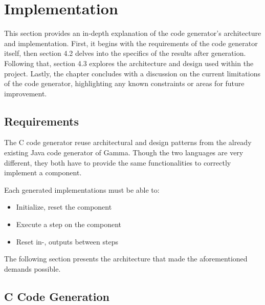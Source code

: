 \chapter{Implementation}

This section provides an in-depth explanation of the code generator's architecture and implementation. First, it begins with the requirements of the code generator itself, then section 4.2 delves into the specifics of the results after generation. Following that, section 4.3 explores the architecture and design used within the project. Lastly, the chapter concludes with a discussion on the current limitations of the code generator, highlighting any known constraints or areas for future improvement.

\section{Requirements}

The C code generator reuse architectural and design patterns from
the already existing Java code generator\cite{Gamma} of Gamma. Though the two languages are very different, they both have to provide the same functionalities to correctly implement a component.

Each generated implementations must be able to:
\begin{itemize}
	\item Initialize, reset the component
	\item Execute a step on the component
	\item Reset in-, outputs between steps
\end{itemize}

The following section presents the architecture that made the aforementioned demands possible. 

\section{C Code Generation}

